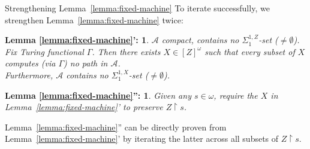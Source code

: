 \begin{frame}{Strengthening Lemma~\ref{lemma:fixed-machine}}
  To iterate successfully, we strengthen Lemma~\ref{lemma:fixed-machine}
  twice:
  \newtheorem*{lemma-strengthened1*}{Lemma \ref{lemma:fixed-machine}':}
  \begin{lemma-strengthened1*}
    $\mathcal{A}$ compact, contains no $\Sigma_1^{1,Z}$-set
    ($\neq\emptyset$). Fix Turing functional $\Gamma$. Then
    there exists $X\in[Z]^\omega$ such that every subset of $X$ computes
    (via $\Gamma$) no path in $\mathcal{A}$.\\
    \vspace{0.5em}
    Furthermore, $\mathcal{A}$ contains no $\Sigma_1^{1,X}$-set
    ($\neq\emptyset$).
  \end{lemma-strengthened1*}

  \vspace{0.5em}
  \newtheorem*{lemma-strengthened2*}{Lemma \ref{lemma:fixed-machine}'':}
  \begin{lemma-strengthened2*}
    Given any $s\in\omega$, require the $X$ in
    Lemma~\ref{lemma:fixed-machine}' to preserve $Z\restriction s$.
  \end{lemma-strengthened2*}

  \vspace{0.5em}
  Lemma~\ref{lemma:fixed-machine}'' can be directly proven from
  Lemma~\ref{lemma:fixed-machine}' by iterating the latter across all
  subsets of $Z\restriction s$.
\end{frame}


